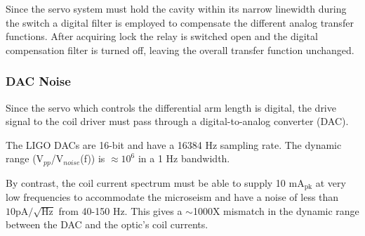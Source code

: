 Since the servo system must hold the cavity within its narrow linewidth
during the switch a digital filter is employed to compensate the different
analog transfer functions. After acquiring lock the relay is switched
open and the digital compensation filter is turned off, leaving the
overall transfer function unchanged.



\subsubsection{DAC Noise}

Since the servo which controls the differential arm length is digital, the
drive signal to the coil driver must pass through a digital-to-analog
converter (DAC).


The LIGO DACs are 16-bit and have a 16384 Hz sampling rate. The dynamic
range (V$_{pp}$/V$_{noise}$(f)) is $\approx10^6$ in a 1 Hz bandwidth.

By contrast, the coil current spectrum must be able to supply 10 mA$_{\mbox{pk}}$ at
very low frequencies to accommodate the microseism and have a noise of less
than $10 \mbox{pA}/\sqrt{\mbox{Hz}}$ from 40-150 Hz. This gives a $\sim$1000X mismatch
in the dynamic range between the DAC and the optic's coil currents.


